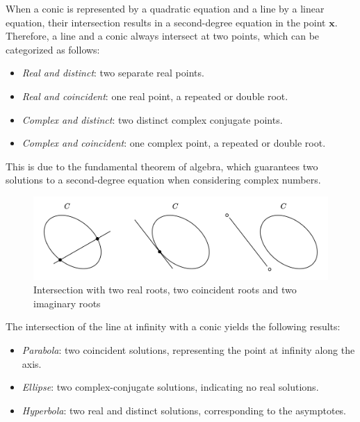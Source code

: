 When a conic is represented by a quadratic equation and a line by a linear equation, their intersection results in a second-degree equation in the point $\mathbf{x}$. 
Therefore, a line and a conic always intersect at two points, which can be categorized as follows:
\begin{itemize}
    \item \textit{Real and distinct}: two separate real points.
    \item \textit{Real and coincident}: one real point, a repeated or double root.
    \item \textit{Complex and distinct}: two distinct complex conjugate points.
    \item \textit{Complex and coincident}: one complex point, a repeated or double root.
\end{itemize}
This is due to the fundamental theorem of algebra, which guarantees two solutions to a second-degree equation when considering complex numbers.
\begin{figure}[H]
    \centering
    \includegraphics[width=0.75\linewidth]{images/intersection.png}
    \caption{Intersection with two real roots, two coincident roots and two imaginary roots}
\end{figure}
The intersection of the line at infinity with a conic yields the following results:
\begin{itemize}
    \item \textit{Parabola}: two coincident solutions, representing the point at infinity along the axis.
    \item \textit{Ellipse}: two complex-conjugate solutions, indicating no real solutions.
    \item \textit{Hyperbola}: two real and distinct solutions, corresponding to the asymptotes.
\end{itemize}

